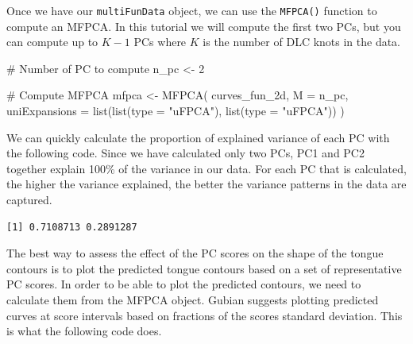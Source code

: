 \documentclass[
  man,
  longtable,
  nolmodern,
  notxfonts,
  notimes,
  colorlinks=true,linkcolor=blue,citecolor=blue,urlcolor=blue]{apa7}
\newenvironment{Shaded}{\begin{snugshade}}{\end{snugshade}}
\newcommand{\AttributeTok}[1]{\textcolor[rgb]{0.40,0.45,0.13}{#1}}
\newcommand{\CommentTok}[1]{\textcolor[rgb]{0.37,0.37,0.37}{#1}}
\newcommand{\DecValTok}[1]{\textcolor[rgb]{0.68,0.00,0.00}{#1}}
\newcommand{\FunctionTok}[1]{\textcolor[rgb]{0.28,0.35,0.67}{#1}}
\newcommand{\NormalTok}[1]{\textcolor[rgb]{0.00,0.23,0.31}{#1}}
\newcommand{\OtherTok}[1]{\textcolor[rgb]{0.00,0.23,0.31}{#1}}
\newcommand{\SpecialCharTok}[1]{\textcolor[rgb]{0.37,0.37,0.37}{#1}}
\newcommand{\StringTok}[1]{\textcolor[rgb]{0.13,0.47,0.30}{#1}}
\begin{document}
Once we have our \texttt{multiFunData} object, we can use the
\texttt{MFPCA()} function to compute an MFPCA. In this tutorial we will
compute the first two PCs, but you can compute up to \(K-1\) PCs where
\(K\) is the number of DLC knots in the data.

\begin{Shaded}
\begin{Highlighting}[]
\CommentTok{\# Number of PC to compute}
\NormalTok{n\_pc }\OtherTok{\textless{}{-}} \DecValTok{2}

\CommentTok{\# Compute MFPCA}
\NormalTok{mfpca }\OtherTok{\textless{}{-}} \FunctionTok{MFPCA}\NormalTok{(}
\NormalTok{  curves\_fun\_2d,}
  \AttributeTok{M =}\NormalTok{ n\_pc,}
  \AttributeTok{uniExpansions =} \FunctionTok{list}\NormalTok{(}\FunctionTok{list}\NormalTok{(}\AttributeTok{type =} \StringTok{"uFPCA"}\NormalTok{), }\FunctionTok{list}\NormalTok{(}\AttributeTok{type =} \StringTok{"uFPCA"}\NormalTok{))}
\NormalTok{)}
\end{Highlighting}
\end{Shaded}

We can quickly calculate the proportion of explained variance of each PC
with the following code. Since we have calculated only two PCs, PC1 and
PC2 together explain 100\% of the variance in our data. For each PC that
is calculated, the higher the variance explained, the better the
variance patterns in the data are captured.

\begin{Shaded}
\end{Shaded}

\begin{verbatim}
[1] 0.7108713 0.2891287
\end{verbatim}

The best way to assess the effect of the PC scores on the shape of the
tongue contours is to plot the predicted tongue contours based on a set
of representative PC scores. In order to be able to plot the predicted
contours, we need to calculate them from the MFPCA object. Gubian
suggests plotting predicted curves at score intervals based on fractions
of the scores standard deviation. This is what the following code does.
\end{document}
